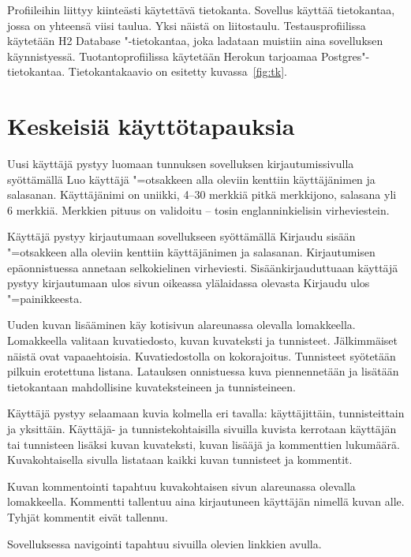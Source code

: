 \documentclass[finnish,colorlinks,headings=normal,parskip=half,footsepline]{scrartcl}
\begin{document}
Profiileihin liittyy kiinteästi käytettävä tietokanta. Sovellus käyttää tietokantaa, jossa on yhteensä viisi taulua. Yksi näistä on liitostaulu. Testausprofiilissa käytetään H2 Database "-tietokantaa, joka ladataan muistiin aina sovelluksen käynnistyessä. Tuotantoprofiilissa käytetään Herokun tarjoamaa Postgres"-tietokantaa. Tietokantakaavio on esitetty kuvassa~\ref{fig:tk}.

\section{Keskeisiä käyttötapauksia}
Uusi käyttäjä pystyy luomaan tunnuksen sovelluksen kirjautumissivulla syöttämällä Luo käyttäjä "=otsakkeen alla oleviin kenttiin käyttäjänimen ja salasanan. Käyttäjänimi on uniikki, 4--30 merkkiä pitkä merkkijono, salasana yli 6 merkkiä. Merkkien pituus on validoitu -- tosin englanninkielisin virheviestein.

Käyttäjä pystyy kirjautumaan sovellukseen syöttämällä Kirjaudu sisään "=otsakkeen alla oleviin kenttiin käyttäjänimen ja salasanan. Kirjautumisen epäonnistuessa annetaan selkokielinen virheviesti. Sisäänkirjauduttuaan käyttäjä pystyy kirjautumaan ulos sivun oikeassa ylälaidassa olevasta Kirjaudu ulos "=painikkeesta.

Uuden kuvan lisääminen käy kotisivun alareunassa olevalla lomakkeella. Lomakkeella valitaan kuvatiedosto, kuvan kuvateksti ja tunnisteet. Jälkimmäiset näistä ovat vapaaehtoisia. Kuvatiedostolla on kokorajoitus. Tunnisteet syötetään pilkuin erotettuna listana. Latauksen onnistuessa kuva piennennetään ja lisätään tietokantaan mahdollisine kuvateksteineen ja tunnisteineen.

Käyttäjä pystyy selaamaan kuvia kolmella eri tavalla: käyttäjittäin, tunnisteittain ja yksittäin. Käyttäjä- ja tunnistekohtaisilla sivuilla kuvista kerrotaan käyttäjän tai tunnisteen lisäksi kuvan kuvateksti, kuvan lisääjä ja kommenttien lukumäärä. Kuvakohtaisella sivulla listataan kaikki kuvan tunnisteet ja kommentit.

Kuvan kommentointi tapahtuu kuvakohtaisen sivun alareunassa olevalla lomakkeella. Kommentti tallentuu aina kirjautuneen käyttäjän nimellä kuvan alle. Tyhjät kommentit eivät tallennu.

Sovelluksessa navigointi tapahtuu sivuilla olevien linkkien avulla.																																																																																																																																																																																																																																																																																																																																																																																																																				
\end{document}
